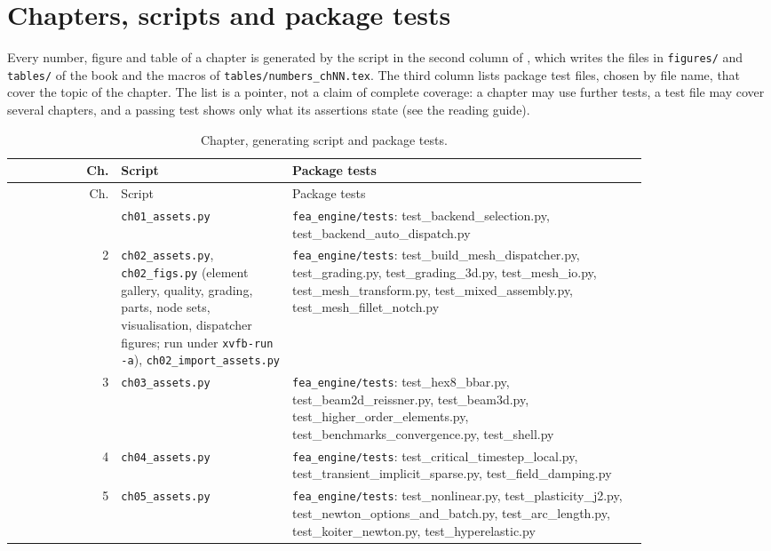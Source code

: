 \chapter{Chapters, scripts and package tests}\label{ch:map}

Every number, figure and table of a chapter is generated by the script in the second column of , which writes the files in \texttt{figures/} and \texttt{tables/} of the book and the macros of \texttt{tables/numbers\_chNN.tex}. The third column lists package test files, chosen by file name, that cover the topic of the chapter. The list is a pointer, not a claim of complete coverage: a chapter may use further tests, a test file may cover several chapters, and a passing test shows only what its assertions state (see the reading guide).

\begin{longtable}{@{}r >{\raggedright\arraybackslash}p{0.27\linewidth} >{\raggedright\arraybackslash}p{0.56\linewidth}@{}}
\caption{Chapter, generating script and package tests.}\label{tab:map}\\
\toprule
Ch. & Script & Package tests \\
\midrule
\endfirsthead
\toprule
Ch. & Script & Package tests \\
\midrule
\endhead
\bottomrule
\endfoot
1 & \texttt{ch01\_assets.py} & \texttt{fea\_engine/tests}: test\_backend\_selection.py, test\_backend\_auto\_dispatch.py \\
2 & \texttt{ch02\_assets.py}, \texttt{ch02\_figs.py} (element gallery, quality, grading, parts, node sets, visualisation, dispatcher figures; run under \texttt{xvfb-run -a}), \texttt{ch02\_import\_assets.py} & \texttt{fea\_engine/tests}: test\_build\_mesh\_dispatcher.py, test\_grading.py, test\_grading\_3d.py, test\_mesh\_io.py, test\_mesh\_transform.py, test\_mixed\_assembly.py, test\_mesh\_fillet\_notch.py \\
3 & \texttt{ch03\_assets.py} & \texttt{fea\_engine/tests}: test\_hex8\_bbar.py, test\_beam2d\_reissner.py, test\_beam3d.py, test\_higher\_order\_elements.py, test\_benchmarks\_convergence.py, test\_shell.py \\
4 & \texttt{ch04\_assets.py} & \texttt{fea\_engine/tests}: test\_critical\_timestep\_local.py, test\_transient\_implicit\_sparse.py, test\_field\_damping.py \\
5 & \texttt{ch05\_assets.py} & \texttt{fea\_engine/tests}: test\_nonlinear.py, test\_plasticity\_j2.py, test\_newton\_options\_and\_batch.py, test\_arc\_length.py, test\_koiter\_newton.py, test\_hyperelastic.py \\

\end{longtable}
